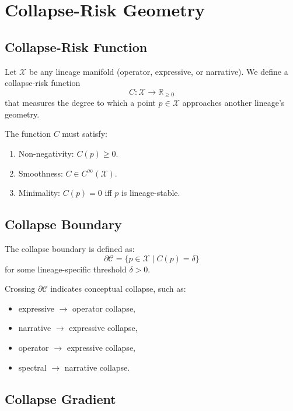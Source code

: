 
\section{Collapse-Risk Geometry}
\label{sec:collapse-risk-geometry}

\subsection{Collapse-Risk Function}

Let $\mathcal{X}$ be any lineage manifold (operator, expressive, or narrative).
We define a collapse-risk function
\[
C : \mathcal{X} \rightarrow \mathbb{R}_{\ge 0}
\]
that measures the degree to which a point $p \in \mathcal{X}$ approaches
another lineage’s geometry.

The function $C$ must satisfy:

\begin{enumerate}
    \item Non-negativity: $C(p) \ge 0$.
    \item Smoothness: $C \in C^\infty(\mathcal{X})$.
    \item Minimality: $C(p) = 0$ iff $p$ is lineage-stable.
\end{enumerate}

\subsection{Collapse Boundary}

The collapse boundary is defined as:
\[
\partial \mathcal{C} = \{ p \in \mathcal{X} \mid C(p) = \delta \}
\]
for some lineage-specific threshold $\delta > 0$.

Crossing $\partial \mathcal{C}$ indicates conceptual collapse, such as:

\begin{itemize}
    \item expressive $\rightarrow$ operator collapse,
    \item narrative $\rightarrow$ expressive collapse,
    \item operator $\rightarrow$ expressive collapse,
    \item spectral $\rightarrow$ narrative collapse.
\end{itemize}

\subsection{Collapse Gradient}

